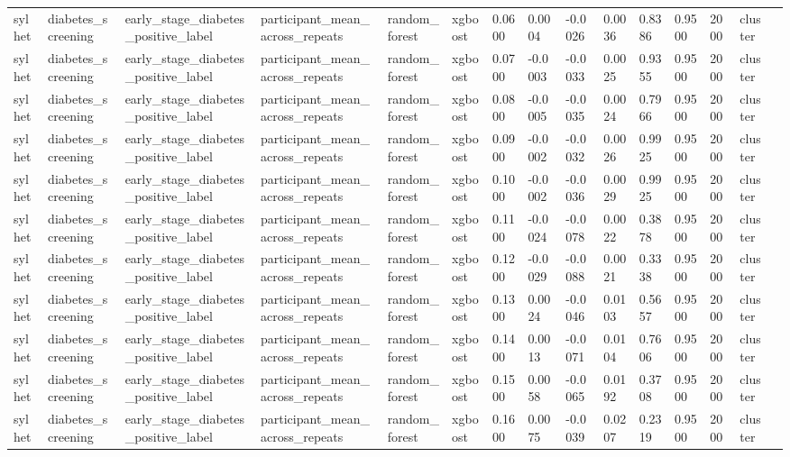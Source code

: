 \begin{tabular}{lllllllllllllll}
sylhet & diabetes\_screening & early\_stage\_diabetes\_positive\_label & participant\_mean\_across\_repeats & random\_forest & xgboost & 0.0600 & 0.0004 & -0.0026 & 0.0036 & 0.8386 & 0.9500 & 2000 & cluster &  \\
sylhet & diabetes\_screening & early\_stage\_diabetes\_positive\_label & participant\_mean\_across\_repeats & random\_forest & xgboost & 0.0700 & -0.0003 & -0.0033 & 0.0025 & 0.9355 & 0.9500 & 2000 & cluster &  \\
sylhet & diabetes\_screening & early\_stage\_diabetes\_positive\_label & participant\_mean\_across\_repeats & random\_forest & xgboost & 0.0800 & -0.0005 & -0.0035 & 0.0024 & 0.7966 & 0.9500 & 2000 & cluster &  \\
sylhet & diabetes\_screening & early\_stage\_diabetes\_positive\_label & participant\_mean\_across\_repeats & random\_forest & xgboost & 0.0900 & -0.0002 & -0.0032 & 0.0026 & 0.9925 & 0.9500 & 2000 & cluster &  \\
sylhet & diabetes\_screening & early\_stage\_diabetes\_positive\_label & participant\_mean\_across\_repeats & random\_forest & xgboost & 0.1000 & -0.0002 & -0.0036 & 0.0029 & 0.9925 & 0.9500 & 2000 & cluster &  \\
sylhet & diabetes\_screening & early\_stage\_diabetes\_positive\_label & participant\_mean\_across\_repeats & random\_forest & xgboost & 0.1100 & -0.0024 & -0.0078 & 0.0022 & 0.3878 & 0.9500 & 2000 & cluster &  \\
sylhet & diabetes\_screening & early\_stage\_diabetes\_positive\_label & participant\_mean\_across\_repeats & random\_forest & xgboost & 0.1200 & -0.0029 & -0.0088 & 0.0021 & 0.3338 & 0.9500 & 2000 & cluster &  \\
sylhet & diabetes\_screening & early\_stage\_diabetes\_positive\_label & participant\_mean\_across\_repeats & random\_forest & xgboost & 0.1300 & 0.0024 & -0.0046 & 0.0103 & 0.5657 & 0.9500 & 2000 & cluster &  \\
sylhet & diabetes\_screening & early\_stage\_diabetes\_positive\_label & participant\_mean\_across\_repeats & random\_forest & xgboost & 0.1400 & 0.0013 & -0.0071 & 0.0104 & 0.7606 & 0.9500 & 2000 & cluster &  \\
sylhet & diabetes\_screening & early\_stage\_diabetes\_positive\_label & participant\_mean\_across\_repeats & random\_forest & xgboost & 0.1500 & 0.0058 & -0.0065 & 0.0192 & 0.3708 & 0.9500 & 2000 & cluster &  \\
sylhet & diabetes\_screening & early\_stage\_diabetes\_positive\_label & participant\_mean\_across\_repeats & random\_forest & xgboost & 0.1600 & 0.0075 & -0.0039 & 0.0207 & 0.2319 & 0.9500 & 2000 & cluster &  \\

\end{tabular}
